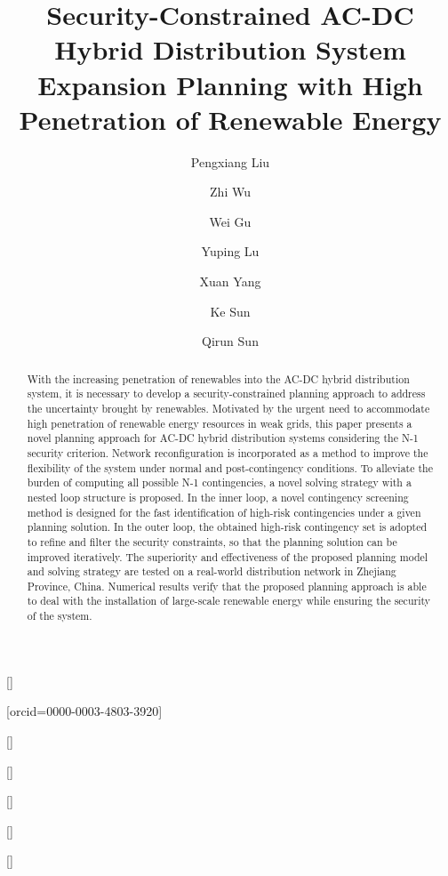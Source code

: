 \documentclass[a4paper,fleqn]{cas-dc}
\begin{document}
\let\WriteBookmarks\relax
\def\floatpagepagefraction{1}
\def\textpagefraction{.001}

\setlength{\abovedisplayskip}{3pt}
\setlength{\belowdisplayskip}{3pt}
\setlength{\mathindent}{0pt}

\shorttitle{}


\title[mode = title]{
    Security-Constrained AC-DC Hybrid Distribution System Expansion Planning 
    with High Penetration of Renewable Energy 
}  




\author[SEU]{Pengxiang Liu}[]
\author[SEU]{Zhi Wu}[orcid=0000-0003-4803-3920]
\cormark[1]
\author[SEU]{Wei Gu}[]
\author[SEU]{Yuping Lu}[]
\author[SGCC_Hangzhou]{Xuan Yang}[]
\author[SGCC_Zhejiang]{Ke Sun}[]
\author[SEU]{Qirun Sun}[]


\begin{abstract}
With the increasing penetration of renewables into the AC-DC hybrid 
distribution system, it is necessary to develop a security-constrained planning 
approach to address the uncertainty brought by renewables. Motivated by the 
urgent need to accommodate high penetration of renewable energy resources in 
weak grids, this paper presents a novel planning approach for AC-DC hybrid 
distribution systems considering the N-1 security criterion. Network 
reconfiguration is incorporated as a method to improve the flexibility of the 
system under normal and post-contingency conditions. To alleviate the burden of 
computing all possible N-1 contingencies, a novel solving strategy with a 
nested loop structure is proposed. In the inner loop, a novel contingency 
screening method is designed for the fast identification of high-risk 
contingencies under a given planning solution. In the outer loop, the obtained
high-risk contingency set is adopted to refine and filter the security 
constraints, so that the planning solution can be improved iteratively. The 
superiority and effectiveness of the proposed planning model and solving 
strategy are tested on a real-world distribution network in Zhejiang Province, 
China. Numerical results verify that the proposed planning approach is able to
deal with the installation of large-scale renewable energy while ensuring the 
security of the system.
\end{abstract}
\end{document}
